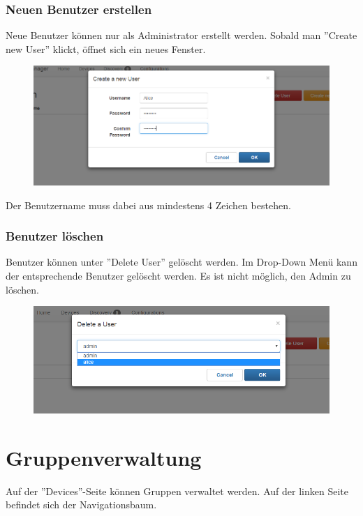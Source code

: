 \subsubsection{Neuen Benutzer erstellen}
Neue Benutzer können nur als Administrator erstellt werden. Sobald man ''Create new User'' klickt, öffnet sich ein neues Fenster.

\begin{figure}[H]
\includegraphics[scale=0.6]{../05_Schlussbericht/images/benutzeranleitung/create_new_user.png}
\end{figure}
Der Benutzername muss dabei aus mindestens 4 Zeichen bestehen.

\subsubsection{Benutzer löschen}
Benutzer können unter ''Delete User'' gelöscht werden. Im Drop-Down Menü kann der entsprechende Benutzer gelöscht werden. Es ist nicht möglich, den Admin zu löschen.
\begin{figure}[H]
\includegraphics[scale=0.7]{../05_Schlussbericht/images/benutzeranleitung/delete_user.png}
\end{figure}
\newpage

\section{Gruppenverwaltung}
Auf der ''Devices''-Seite können Gruppen verwaltet werden. Auf der linken Seite befindet sich der Navigationsbaum. 

